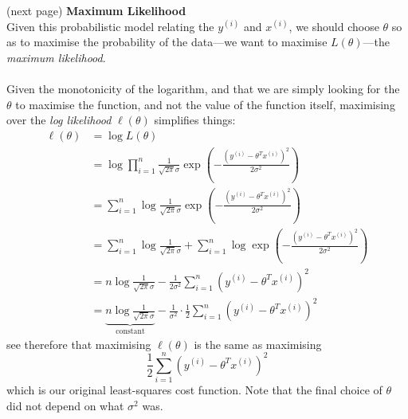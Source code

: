 \documentclass{report}
\begin{document}
(next page)
\newpage
\noindent\textbf{Maximum Likelihood}\\
Given this probabilistic model relating the $y^{(i)}$ and $x^{(i)}$, we should choose $\theta$ so as to maximise
the probability of the data---we want to maximise $L(\theta)$---the \textit{maximum likelihood}.\\
\vspace{1mm}\\
Given the monotonicity of the logarithm, and that we are simply looking for the $\theta$ to maximise the function,
and not the value of the function itself, maximising over the \textit{log likelihood} $\ell(\theta)$ simplifies 
things:
\begin{align*}
\ell(\theta)&=\log L(\theta)\\
&=\log\prod^n_{i=1}\frac{1}{\sqrt{2\pi}\sigma}\exp\left(-\frac{(y^{(i)}-\theta^Tx^{(i)})^2}{2\sigma^2}\right)\\
&=\sum^n_{i=1}\log\frac{1}{\sqrt{2\pi}\sigma}\exp\left(-\frac{(y^{(i)}-\theta^Tx^{(i)})^2}{2\sigma^2}\right)\\
&=\sum^n_{i=1}\log\frac{1}{\sqrt{2\pi}\sigma}+\sum^n_{i=1}\log\exp\left(-\frac{(y^{(i)}
-\theta^Tx^{(i)})^2}{2\sigma^2}\right)\\
&=n\log\frac{1}{\sqrt{2\pi}\sigma}-\frac{1}{2\sigma^2}\sum^n_{i=1}(y^{(i)}-\theta^Tx^{(i)})^2\\
&=\underbrace{n\log\frac{1}{\sqrt{2\pi}\sigma}}_{\text{constant}}
-\frac{1}{\sigma^2}\cdot\frac{1}{2}\sum^n_{i=1}(y^{(i)}-\theta^Tx^{(i)})^2
\end{align*}
see therefore that maximising $\ell(\theta)$ is the same as maximising
\begin{equation*}
\frac{1}{2}\sum^n_{i=1}(y^{(i)}-\theta^Tx^{(i)})^2
\end{equation*}
which is our original least-squares cost function. Note that the final choice of $\theta$ did not depend on what 
$\sigma^2$ was.
\newpage
\end{document}
